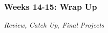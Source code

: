 \documentclass[11pt, letterpaper]{article}
\begin{document}




%

%
%

\subsubsection*{Weeks 14-15: Wrap Up}
\textit{Review, Catch Up, Final Projects}


\end{document}
